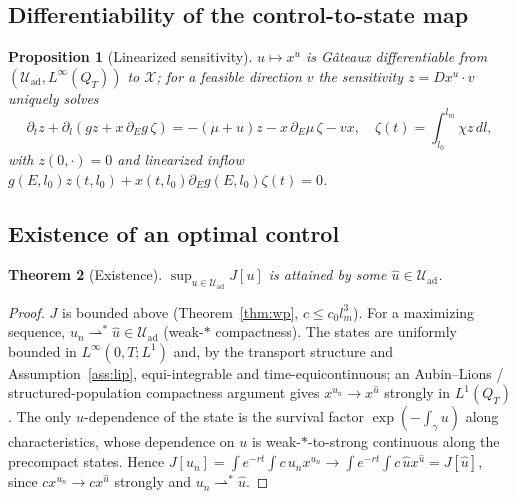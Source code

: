 \documentclass[pdflatex,sn-mathphys-num]{sn-jnl}
\newcommand{\Uad}{\mathcal{U}_{\mathrm{ad}}}
\newcommand{\X}{\mathcal{X}}
\newcommand{\Qt}{Q_T}
\theoremstyle{thmstyleone}
\newtheorem{theorem}{Theorem}[section]
\newtheorem{proposition}[theorem]{Proposition}
\theoremstyle{definition}
\theoremstyle{remark}
\begin{document}
\subsection{Differentiability of the control-to-state map}
\begin{proposition}[Linearized sensitivity]\label{prop:diff}
$u\mapsto x^u$ is G\^ateaux differentiable from $(\Uad,L^\infty(\Qt))$ to $\X$;
for a feasible direction $v$ the sensitivity $z=Dx^u\!\cdot v$ uniquely solves
\[
\partial_t z+\partial_l(g z+x\,\partial_E g\,\zeta)=-(\mu+u)z-x\,\partial_E\mu\,\zeta-v x,
\quad \zeta(t)=\int_{l_0}^{l_m}\chi z\,dl,
\]
with $z(0,\cdot)=0$ and linearized inflow
$g(E,l_0)z(t,l_0)+x(t,l_0)\partial_E g(E,l_0)\zeta(t)=0$.
\end{proposition}

\subsection{Existence of an optimal control}
\begin{theorem}[Existence]\label{thm:exist}
$\sup_{u\in\Uad}J[u]$ is attained by some $\hat u\in\Uad$.
\end{theorem}
\begin{proof}
$J$ is bounded above (Theorem~\ref{thm:wp}, $c\le c_0 l_m^3$). For a maximizing
sequence, $u_n\rightharpoonup^* \hat u\in\Uad$ (weak-$\ast$ compactness). The states are
uniformly bounded in $L^\infty(0,T;L^1)$ and, by the transport structure and
Assumption~\ref{ass:lip}, equi-integrable and time-equicontinuous; an
Aubin--Lions / structured-population compactness argument \cite{anita_analysis_2000}
gives $x^{u_n}\to x^{\hat u}$ strongly in $L^1(\Qt)$. The only $u$-dependence of the
state is the survival factor $\exp(-\int_\gamma u)$ along characteristics, whose
dependence on $u$ is weak-$\ast$-to-strong continuous along the precompact states.
Hence
$J[u_n]=\int e^{-rt}\!\int c\,u_n x^{u_n}\to\int e^{-rt}\!\int c\,\hat u x^{\hat u}=J[\hat u]$,
since $c x^{u_n}\to c x^{\hat u}$ strongly and $u_n\rightharpoonup^* \hat u$.
\end{proof}
\end{document}
